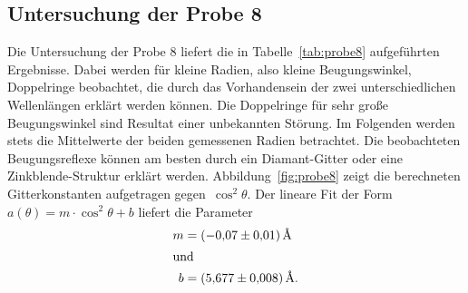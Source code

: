 \subsection{Untersuchung der Probe 8}

Die Untersuchung der Probe 8 liefert die in Tabelle~\ref{tab:probe8}
aufgeführten Ergebnisse. Dabei werden für kleine Radien, also kleine Beugungswinkel,
Doppelringe beobachtet, die durch das Vorhandensein der zwei unterschiedlichen
Wellenlängen erklärt werden können. Die Doppelringe für sehr große Beugungswinkel
sind Resultat einer unbekannten Störung. Im Folgenden werden stets die Mittelwerte
der beiden gemessenen Radien betrachtet. Die beobachteten Beugungsreflexe können am besten durch
ein Diamant-Gitter oder eine Zinkblende-Struktur erklärt werden.
Abbildung~\ref{fig:probe8} zeigt die
berechneten Gitterkonstanten aufgetragen gegen~$\cos^2{\theta}$. Der lineare Fit
der Form~$a(\theta)=m\cdot\cos^2{\theta}+b$ liefert die Parameter
%
\begin{align}
  m&=\SI{-0.07(1)}{\angstrom} \\
  \shortintertext{und}
  b&=\SI{5.677(8)}{\angstrom}.
\end{align}

